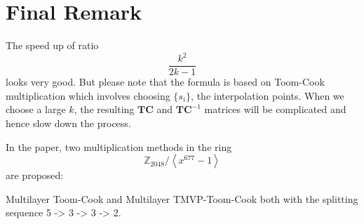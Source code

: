 \documentclass[
11pt,notheorems,hyperref={pdfauthor=whatever}
]{beamer}
\begin{document}
\section{Final Remark}
\begin{frame}

        The speed up of ratio
        \[\frac{k^{2}}{2k-1}\]
        looks very good. 
        But please note that the formula is based on Toom-Cook multiplication which involves choosing $\{s_{i}\}$, the interpolation points.
        When we choose a large $k$, the resulting $\mathbf{TC}$ and $\mathbf{TC}^{-1}$ matrices will be complicated and hence slow down the process.

        In the paper, two multiplication methods in the ring
        \[
        \mathbb{Z}_{2048}/\left\langle x^{677}-1\right\rangle
        \]
        are proposed:
        
        Multilayer Toom-Cook and Multilayer TMVP-Toom-Cook both with the splitting sequence 5 -> 3 -> 3 -> 2.

\end{frame}



\begin{frame}
    
\end{frame}
\end{document}
